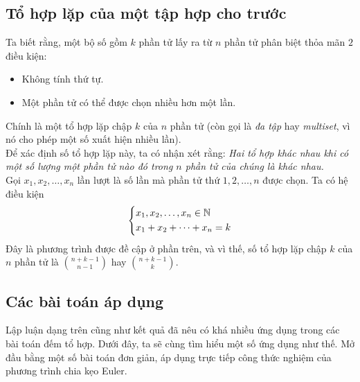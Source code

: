  \subsection{Tổ hợp lặp của một tập hợp cho trước}
 Ta biết rằng, một bộ số gồm $k$ phần tử lấy ra từ $n$ phần tử phân biệt thỏa mãn $2$ điều kiện:
 \begin{itemize}
 	\item Không tính thứ tự.
 	\item Một phần tử có thể được chọn nhiều hơn một lần.
 \end{itemize} 
 Chính là một tổ hợp lặp chập $k$ của $n$ phần tử (còn gọi là \textit{đa tập} hay \textit{multiset}, vì nó cho phép một số xuất hiện nhiều lần).\\
 Để xác định số tổ hợp lặp này, ta có nhận xét rằng: \textit{Hai tổ hợp khác nhau khi có một số lượng một phần tử nào đó trong $n$ phần tử của chúng là khác nhau.}\\
 Gọi $x_1,x_2,\ldots,x_n$ lần lượt là số lần mà phần tử thứ $1,2,\ldots,n$ được chọn. Ta có hệ điều kiện
 $$\left\{\begin{aligned}&x_1,x_2,\ldots,x_n\in \mathbb{N}\\
 	&x_1+x_2+\cdots+x_n=k\end{aligned}\right.$$
 Đây là phương trình được đề cập ở phần trên, và vì thế, số tổ hợp lặp chập $k$ của $n$ phần tử là $\displaystyle{n+k-1 \choose n-1} $ hay $\displaystyle{n+k-1 \choose k}$.
 
\subsection{Các bài toán áp dụng}
 Lập luận dạng trên cũng như kết quả đã nêu có khá nhiều ứng dụng trong các bài toán đếm tổ hợp. Dưới đây, ta sẽ cùng tìm hiểu một số ứng dụng như thế. Mở đầu bằng một số bài toán đơn giản, áp dụng trực tiếp công thức nghiệm của phương trình chia kẹo Euler.
 
